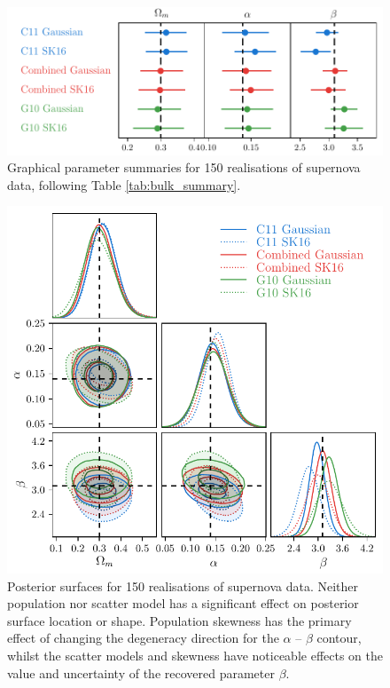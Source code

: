 \documentclass[a4paper,fleqn,usenatbib]{mnras}
\begin{document}
\begin{figure}
	\begin{center}
		\includegraphics[width=\columnwidth]{approximate_bulk_load_summary.pdf}
	\end{center}
	\caption{Graphical parameter summaries for 150 realisations of supernova data, following Table \ref{tab:bulk_summary}.}
	\label{fig:bulk_summary}
\end{figure}

\begin{figure}
	\begin{center}
		\includegraphics[width=\columnwidth]{approximate_bulk_load.pdf}
	\end{center}
	\caption{Posterior surfaces for 150 realisations of supernova data. Neither population nor scatter model has a significant effect on posterior surface location or shape. Population skewness has the primary effect of changing the degeneracy direction for the $\alpha$ -- $\beta$ contour, whilst the scatter models and skewness have noticeable effects on the value and uncertainty of the recovered parameter $\beta$.}
	\label{fig:bulk_posterior}
\end{figure}
\end{document}
